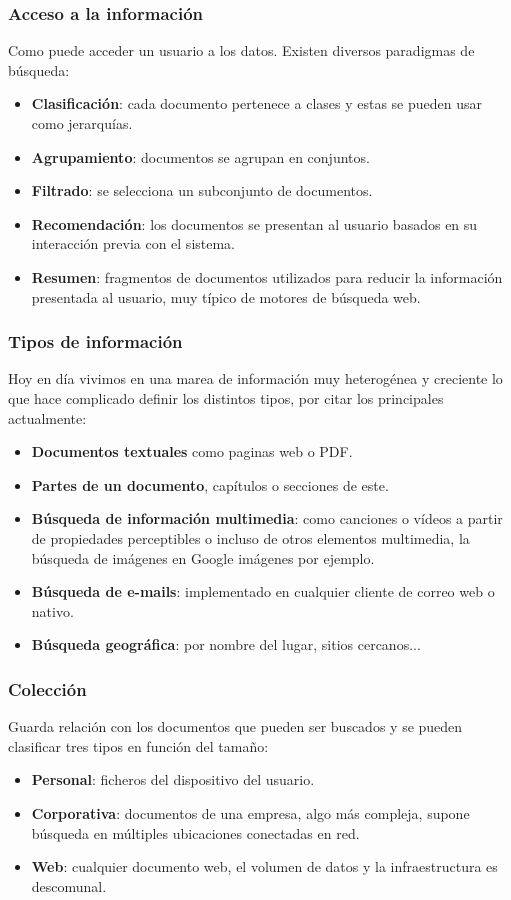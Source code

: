 \subsubsection{Acceso a la información}
Como puede acceder un usuario a los datos. Existen diversos paradigmas de búsqueda:
\begin{itemize}
	\item \textbf{Clasificación}: cada documento pertenece a clases y estas se pueden usar como jerarquías.
	\item \textbf{Agrupamiento}: documentos se agrupan en conjuntos.
	\item \textbf{Filtrado}: se selecciona un subconjunto de documentos.
	\item \textbf{Recomendación}: los documentos se presentan al usuario basados en su interacción previa con el sistema.
	\item \textbf{Resumen}: fragmentos de documentos utilizados para reducir la información presentada al usuario, muy típico de motores de búsqueda web.
\end{itemize}
\subsubsection{Tipos de información}
Hoy en día vivimos en una marea de información muy heterogénea y creciente lo que hace complicado definir los distintos tipos, por citar los principales actualmente:
\begin{itemize}
	\item \textbf{Documentos textuales} como paginas web o \acrshort{PDF}.
	\item \textbf{Partes de un documento}, capítulos o secciones de este.
	\item \textbf{Búsqueda de información multimedia}: como canciones o vídeos a partir de propiedades perceptibles o incluso de otros elementos multimedia, la búsqueda de imágenes en Google imágenes por ejemplo.
	\item \textbf{Búsqueda de e-mails}: implementado en cualquier cliente de correo web o nativo.
	\item \textbf{Búsqueda geográfica}: por nombre del lugar, sitios cercanos...
\end{itemize}
\subsubsection{Colección}
Guarda relación con los documentos que pueden ser buscados y se pueden clasificar tres tipos en función del tamaño:
\begin{itemize}
		\item \textbf{Personal}: ficheros del dispositivo del usuario.
		\item \textbf{Corporativa}: documentos de una empresa, algo más compleja, supone búsqueda en múltiples ubicaciones conectadas en red.
		\item \textbf{Web}: cualquier documento web, el volumen de datos y la infraestructura es descomunal.
\end{itemize}


